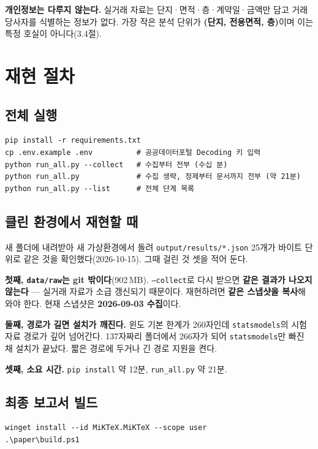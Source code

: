 \textbf{개인정보는 다루지 않는다.} 실거래 자료는 단지·면적·층·계약일·금액만
담고 거래 당사자를 식별하는 정보가 없다. 가장 작은 분석 단위가
\textbf{(단지, 전용면적, 층)}이며 이는 특정 호실이 아니다(3.4절).

\section{재현 절차}

\subsection{전체 실행}

\begin{verbatim}
pip install -r requirements.txt
cp .env.example .env          # 공공데이터포털 Decoding 키 입력
python run_all.py --collect   # 수집부터 전부 (수십 분)
python run_all.py             # 수집 생략, 정제부터 문서까지 전부 (약 21분)
python run_all.py --list      # 전체 단계 목록
\end{verbatim}

\subsection{클린 환경에서 재현할 때}

새 폴더에 내려받아 새 가상환경에서 돌려 \texttt{output/results/*.json} 25개가
바이트 단위로 같은 것을 확인했다(2026-10-15). 그때 걸린 것 셋을 적어 둔다.

\textbf{첫째, \texttt{data/raw}는 git 밖이다}(902\,MB). \texttt{--collect}로 다시
받으면 \textbf{같은 결과가 나오지 않는다} --- 실거래 자료가 소급 갱신되기
때문이다. 재현하려면 \textbf{같은 스냅샷을 복사}해 와야 한다. 현재 스냅샷은
\textbf{2026-09-03 수집}이다.

\textbf{둘째, 경로가 길면 설치가 깨진다.} 윈도 기본 한계가 260자인데
\texttt{statsmodels}의 시험 자료 경로가 깊어 넘어간다. 137자짜리 폴더에서 266자가
되어 \texttt{statsmodels}만 빠진 채 설치가 끝났다. 짧은 경로에 두거나 긴 경로
지원을 켠다.

\textbf{셋째, 소요 시간.} \texttt{pip install} 약 12분, \texttt{run\_all.py} 약
21분.

\subsection{최종 보고서 빌드}

\begin{verbatim}
winget install --id MiKTeX.MiKTeX --scope user
.\paper\build.ps1
\end{verbatim}

